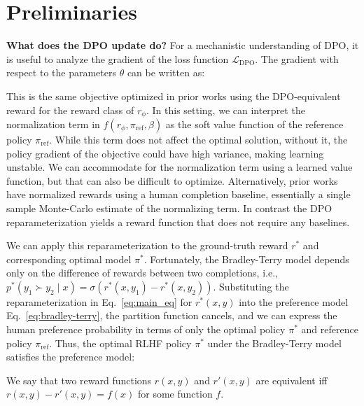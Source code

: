\section{Preliminaries}\label{section:prelims}

\textbf{What does the DPO update do?} For a mechanistic understanding of DPO, it is useful to analyze the gradient of the loss function $\mathcal{L}_\text{DPO}$. The gradient with respect to the parameters $\theta$ can be written as:

This is the same objective optimized in prior works 
\citep{ziegler2020finetuning, stiennon2022learning, bai2022training, ouyang2022training} using the DPO-equivalent reward for the reward class of $r_{\phi}$. In this setting, we can interpret the normalization term in $f(r_{\phi}, \pi_\text{ref}, \beta)$ as the soft value function of the reference policy $\pi_\text{ref}$. While this term does not affect the optimal solution, without it, the policy gradient of the objective could have high variance, making learning unstable. We can accommodate for the normalization term using a learned value function, but that can also be difficult to optimize. Alternatively, prior works have normalized rewards using a human completion baseline, essentially a single sample Monte-Carlo estimate of the normalizing term. In contrast the DPO reparameterization yields a reward function that does not require any baselines. 

We can apply this reparameterization to the ground-truth reward $r^*$ and corresponding optimal model $\pi^*$. Fortunately, the Bradley-Terry model depends only on the difference of rewards between two completions, i.e., ${p^*(y_1 \succ y_2 \mid x) = \sigma(r^*(x, y_1) - r^*(x, y_2))}$. Substituting the reparameterization in Eq.~\ref{eq:main_eq} for $r^*(x,y)$ into the preference model Eq.~\ref{eq:bradley-terry}, the partition function cancels, and we can express the human preference probability in terms of only the optimal policy $\pi^*$ and reference policy $\pi_\text{ref}$. Thus, the optimal RLHF policy $\pi^*$ under the Bradley-Terry model satisfies the preference model:

\begin{definition}
We say that two reward functions $r(x, y)$ and $r'(x, y)$ are equivalent iff ${r(x, y)-r'(x, y) = f(x)}$ for some function $f$.     
\end{definition}

